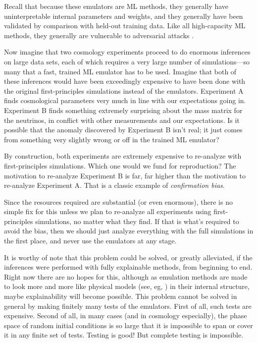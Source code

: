 \documentclass{article}
\begin{document}
Recall that because these emulators are ML methods, they generally have uninterpretable internal parameters and weights, and they generally have been validated by comparison with held-out training data.
Like all high-capacity ML methods, they generally are vulnerable to adversarial attacks \cite{adversarial1}.

Now imagine that two cosmology experiments proceed to do enormous inferences on large data sets, each of which requires a very large number of simulations---so many that a fast, trained ML emulator has to be used.
Imagine that both of these inferences would have been exceedingly expensive to have been done with the original first-principles simulations instead of the emulators.
Experiment A finds cosmological parameters very much in line with our expectations going in.
Experiment B finds something extremely surprising about the mass matrix for the neutrinos, in conflict with other measurements and our expectations.
Is it possible that the anomaly discovered by Experiment B isn't real; it just comes from something very slightly wrong or off in the trained ML emulator?

By construction, both experiments are extremely expensive to re-analyze with first-principles simulations.
Which one would we fund for reproduction?
The motivation to re-analyze Experiment B is far, far higher than the motivation to re-analyze Experiment A.
That is a classic example of \emph{confirmation bias}.

Since the resources required are substantial (or even enormous), there is no simple fix for this unless we plan to re-analyze all experiments using first-principles simulations, no matter what they find.
If that is what's required to avoid the bias, then we should just analyze everything with the full simulations in the first place, and never use the emulators at any stage.

It is worthy of note that this problem could be solved, or greatly alleviated, if the inferences were performed with fully explainable methods, from beginning to end.
Right now there are no hopes for this, although as emulation methods are made to look more and more like physical models (see, eg, \citealt{scalars, villar2023dimensionless}) in their internal structure, maybe explainability will become possible.
This problem cannot be solved in general by making finitely many tests of the emulators.
First of all, such tests are expensive.
Second of all, in many cases (and in cosmology especially), the phase space of random initial conditions is so large that it is impossible to span or cover it in any finite set of tests.
Testing is good! But complete testing is impossible.
\end{document}
